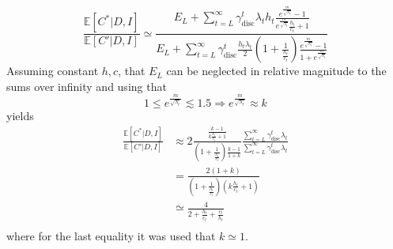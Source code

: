 \begin{equation}
	\frac{\mathbb{E}[C^*|D,I] }{\mathbb{E}[C'|D,I]}\simeq \frac{E_L+\sum_{t=L}^{\infty} \gamma_{\text{disc}}^{t} \lambda_th_t\frac{e^{\frac{m}{\sqrt{\lambda_t}}}-1}{e^{\frac{m}{\sqrt{\lambda_t}}}\frac{h_t}{c_t}+1}}{E_L+\sum_{t=L}^{\infty} \gamma_{\text{disc}}^{t} \frac{h_t\lambda_t}{2} 
		(1+\frac{1}{\frac{h_t}{c_t}})\frac{e^{\frac{m}{\sqrt{\lambda_t}}}-1}{1+e^{\frac{m}{\sqrt{\lambda_t}}}}}
\end{equation}
Assuming constant $h,c$, that $E_L$ can be neglected in relative magnitude to the sums over infinity and using that \begin{equation}
	1\leq e^{\frac{m}{\sqrt{\lambda_t}}}\lesssim 1.5 \Rightarrow  e^{\frac{m}{\sqrt{\lambda_t}}}\approx k
\end{equation}
yields
\begin{equation}
	\begin{split}
		\frac{\mathbb{E}[C^*|D,I] }{\mathbb{E}[C'|D,I]}&\approx2 \frac{\frac{k-1}{k\frac{h_t}{c_t}+1}}{(1+\frac{1}{\frac{h_t}{c_t}})\frac{k-1}{1+k}}\frac{\sum_{t=L}^{\infty} \gamma_{\text{disc}}^{t} \lambda_t}{\sum_{t=L}^{\infty} \gamma_{\text{disc}}^{t} \lambda_t}\\
		&= \frac{2(1+k)}{(1+\frac{1}{\frac{h_t}{c_t}})(k\frac{h_t}{c_t}+1)}\\
		&\simeq \frac{4}{2+\frac{h_t}{c_t}+\frac{c_t}{h_t}}\\
	\end{split}
\end{equation}
where for the last equality it was used that $k\simeq 1$. 